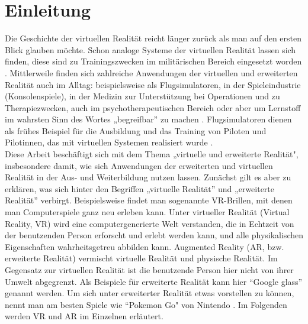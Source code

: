 \documentclass[deutsch]{llncs}
\begin{document}
\tableofcontents
\newpage
{}
\section{Einleitung}
\label{sec:intro}
Die Geschichte der virtuellen Realität reicht länger zurück als man auf den ersten Blick glauben möchte. Schon analoge Systeme der virtuellen Realität lassen sich finden, diese sind zu Trainingszwecken im militärischen Bereich eingesetzt worden \cite{vrnerds}.
Mittlerweile finden sich zahlreiche Anwendungen der virtuellen und erweiterten Realität auch im Alltag: beispielsweise als Flugsimulatoren, in der Spieleindustrie (Konsolenspiele), in der Medizin zur Unterstützung bei Operationen und zu Therapiezwecken, auch im psychotherapeutischen Bereich oder aber um Lernstoff im wahrsten Sinn des Wortes „begreifbar'' zu machen \cite{Klampfer}. 
Flugsimulatoren dienen als frühes Beispiel für die Ausbildung und das Training von Piloten und Pilotinnen, das mit virtuellen Systemen realisiert wurde  \cite{Klampfer}.\\

\noindent
Diese Arbeit beschäftigt sich mit dem Thema „virtuelle und erweiterte Realität", insbesondere damit, wie sich Anwendungen der erweiterten und virtuellen Realität in der Aus- und Weiterbildung nutzen lassen. 
Zunächst gilt es aber zu erklären, was sich hinter den Begriffen „virtuelle Realität'' und „erweiterte Realität'' verbirgt. 
Beispielsweise findet man sogenannte VR-Brillen, mit denen man Computerspiele ganz neu erleben kann.
\label{sec:typo}
Unter virtueller Realität (Virtual Reality, VR) wird eine computergenerierte Welt verstanden, die in Echtzeit von der benutzenden Person erforscht und erlebt werden kann, und alle physikalischen Eigenschaften wahrheitsgetreu abbilden kann. 
Augmented Reality (AR, bzw. erweiterte Realität) vermischt virtuelle Realität und physische Realität. Im Gegensatz zur virtuellen Realität ist die benutzende Person hier nicht von ihrer Umwelt abgegrenzt.
Als Beispiele für erweiterte Realität kann hier ``Google glass'' genannt werden. 
Um sich unter erweiterter Realität etwas vorstellen zu können, nennt man am besten Spiele wie ``Pokemon Go"  von Nintendo \cite{Klampfer}. Im Folgenden werden VR und AR im Einzelnen erläutert.\\
\end{document}
